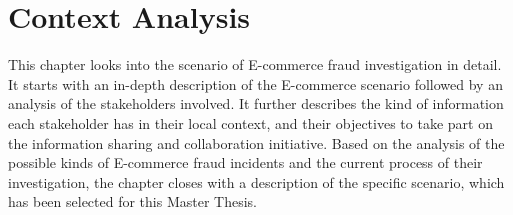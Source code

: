 
\chapter{Context Analysis} %
\label{cha:context_analysis}

This chapter looks into the scenario of \gls{E-commerce} fraud investigation in detail. It starts with an in-depth description of the \gls{E-commerce} scenario followed by an analysis of the stakeholders involved. It further describes the kind of information each stakeholder has in their local context, and their objectives to take part on the information sharing and collaboration initiative. Based on the analysis of the possible kinds of \gls{E-commerce} fraud incidents and the current process of their investigation, the chapter closes with a description of the specific scenario, which has been selected for this Master Thesis.











